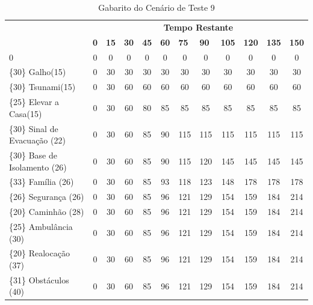 \begin{table}[!h]
\centering
\caption{Gabarito do Cenário de Teste 9}
\label{gabarito9}
\begin{tabular}{lccccccccccc}
\multicolumn{1}{c}{\cellcolor[HTML]{00D2CB}} & \multicolumn{11}{c}{\cellcolor[HTML]{00D2CB}\textbf{Tempo Restante}} \\ 
\multicolumn{1}{c}{\cellcolor[HTML]{00D2CB}{\color[HTML]{333333} \textbf{\{Valor\} Missão(Tempo)}}} & 
\multicolumn{1}{l}{\cellcolor[HTML]{C0F2F0}\textbf{0}} & 
\multicolumn{1}{l}{\cellcolor[HTML]{C0F2F0}\textbf{15}} & 
\multicolumn{1}{l}{\cellcolor[HTML]{C0F2F0}\textbf{30}} & 
\multicolumn{1}{l}{\cellcolor[HTML]{C0F2F0}\textbf{45}} & 
\multicolumn{1}{l}{\cellcolor[HTML]{C0F2F0}\textbf{60}} & 
\multicolumn{1}{l}{\cellcolor[HTML]{C0F2F0}\textbf{75}} & 
\multicolumn{1}{l}{\cellcolor[HTML]{C0F2F0}\textbf{90}} & 
\multicolumn{1}{l}{\cellcolor[HTML]{C0F2F0}\textbf{105}} & 
\multicolumn{1}{l}{\cellcolor[HTML]{C0F2F0}\textbf{120}} & 
\multicolumn{1}{l}{\cellcolor[HTML]{C0F2F0}\textbf{135}} & 
\multicolumn{1}{l}{\cellcolor[HTML]{C0F2F0}\textbf{150}} \\ 
0 & 0 & 0 & 0 & 0 & 0 & 0 & 0 & 0 & 0 & 0 & 0  \\ 
\{30\}  Galho(15) & 0 & 30 & 30 & 30 & 30 & 30 & 30 & 30 & 30 & 30 & 30  \\ 
\{30\}  Tsunami(15) & 0 & 30 & 60 & 60 & 60 & 60 & 60 & 60 & 60 & 60 & 60 \\ 
\{25\}  Elevar a Casa(15)& 0 & 30 & 60 & 80 & 85  & 85  & 85  & 85 & 85 & 85 & 85 \\ 
\{30\}  Sinal de Evacuação (22) & 0 & 30 & 60 & 85 & 90  & 115  & 115  & 115 & 115 & 115 & 115 \\ 
\{30\}  Base de Isolamento (26) & 0 & 30 & 60 & 85 & 90  & 115  & 120  & 145 & 145 & 145 & 145 \\ 
\{33\}  Família (26) & 0 & 30 & 60 & 85 & 93  & 118  & 123  & 148 & 178 & 178 & 178 \\ 
\{26\}  Segurança (26) & 0 & 30 & 60 & 85 & 96  & 121  & 129  & 154 & 159 & 184 & 214 \\ 
{\color[HTML]{FE0000} \{20\}  Caminhão (28)} & 0 & 30 & 60 & 85 & 96  & 121  & 129  & 154 & 159 & 184 & 214 \\ 
{\color[HTML]{FE0000} \{25\}  Ambulância (30)} & 0 & 30 & 60 & 85 & 96  & 121  & 129  & 154 & 159 & 184 & 214 \\ 
{\color[HTML]{FE0000} \{20\}  Realocação (37)} & 0 & 30 & 60 & 85 & 96  & 121  & 129  & 154 & 159 & 184 & 214 \\ 
{\color[HTML]{FE0000} \{31\}  Obstáculos (40)} & 0 & 30 & 60 & 85 & 96  & 121  & 129  & 154 & 159 & 184 & 214 \\ 
\end{tabular}
\end{table}


